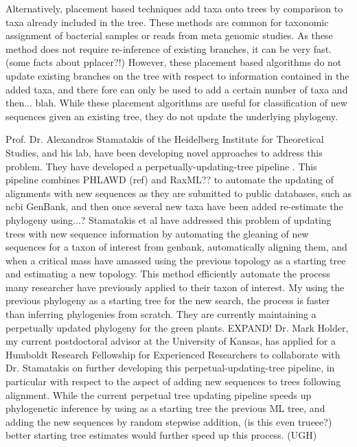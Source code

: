 \documentclass[10pt]{article}
\begin{document}
Alternatively, placement based techniques add taxa onto trees by comparison to  taxa already included in the tree. These methods are common for taxonomic assignment of bacterial samples or reads from meta genomic studies. As these method does not require re-inference of existing branches, it can be very fast. (some facts about pplacer?!) However, these placement based algorithms do not update existing branches on the tree with respect to information contained in the added taxa, and there fore can only be used to add a certain number of taxa and then... blah. While these placement algorithms are useful for classification of new sequences given an existing tree, they do not update the underlying phylogeny.

Prof. Dr. Alexandros Stamatakis of the Heidelberg Institute for Theoretical Studies, and his lab, have been developing novel approaches to address this problem. They have developed a perpetually-updating-tree pipeline \cite{izquierdo-carrasco_algorithms_2011}. 
This pipeline combines PHLAWD (ref) and RaxML?? to automate the updating of alignments with new sequences as they are submitted to public databases, such as ncbi GenBank, and then once several new taxa have been added re-estimate the phylogeny using...? Stamatakis et al have addressed this problem of updating trees with new sequence information by automating the gleaning of new sequences for a taxon of interest from genbank, automatically aligning them, and when a critical mass have amassed using the previous topology as a starting tree and estimating a new topology. This method efficiently automate the process many researcher have previously applied to their taxon of interest. My using the previous phylogeny as a starting tree for the new search, the process is faster than inferring phylogenies from scratch. They  are currently maintaining a perpetually updated phylogeny for the green plants.
EXPAND!
Dr. Mark Holder, my current postdoctoral advisor at the University of Kansas, has applied for a Humboldt Research Fellowship for Experienced Researchers to collaborate with Dr. Stamatakis on further developing this perpetual-updating-tree pipeline, in particular with respect to the aspect of adding new sequences to trees following alignment. While the current perpetual tree updating pipeline speeds up phylogenetic inference by using as a starting tree the previous ML tree, and adding the new sequences by random stepwise addition, (is this even trueee?) better starting tree estimates would further speed up this process. (UGH)
\end{document}
